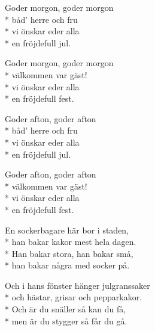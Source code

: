 \begin{SongText}
    \begin{SongVerse}
        Goder morgon, goder morgon\\*%
        båd’ herre och fru\\*%
        vi önskar eder alla\\*%
        en fröjdefull jul.
    \end{SongVerse}
    \begin{SongVerse}
        Goder morgon, goder morgon\\*%
        välkommen var gäst!\\*%
        vi önskar eder alla\\*%
        en fröjdefull fest.
    \end{SongVerse}
    \begin{SongVerse}
        Goder afton, goder afton\\*%
        båd’ herre och fru\\*%
        vi önskar eder alla\\*%
        en fröjdefull jul.
    \end{SongVerse}
    \begin{SongVerse}
        Goder afton, goder afton\\*%
        välkommen var gäst!\\*%
        vi önskar eder alla\\*%
        en fröjdefull fest.
    \end{SongVerse}
    \begin{SongVerse}
    \end{SongVerse}
\end{SongText}
\begin{SongText}[En sockerbagare]
    \begin{SongVerse}
        En sockerbagare här bor i staden,\\*%
        han bakar kakor mest hela dagen.\\*%
        Han bakar stora, han bakar små,\\*%
        han bakar några med socker på.
    \end{SongVerse}
    \begin{SongVerse}
        Och i hans fönster hänger julgranssaker\\*%
        och hästar, grisar och pepparkakor.\\*%
        Och är du snäller så kan du få,\\*%
        men är du stygger så får du gå.
    \end{SongVerse}
    \begin{SongVerse}
    \end{SongVerse}
\end{SongText}
